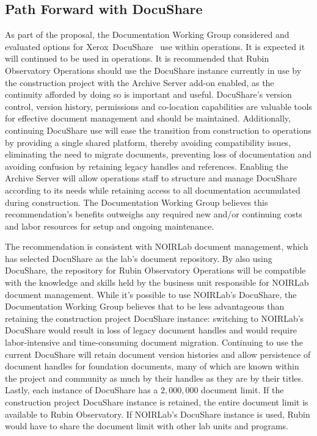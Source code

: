 \subsection{Path Forward with DocuShare}
\label{sec:docushare-path}

As part of the proposal, the Documentation Working Group considered and evaluated options for Xerox\textregistered\ DocuShare\textregistered\ \citep{DocuShare-cite} use within operations.
It is expected it will continued to be used in operations.
It is recommended that Rubin Observatory Operations should use the DocuShare instance currently in use by the construction project with the Archive Server add-on enabled, as the continuity afforded by doing so is important and useful.
DocuShare’s version control, version history, permissions and co-location capabilities are valuable tools for effective document management and should be maintained.
Additionally, continuing DocuShare use will ease the transition from construction to operations by providing a single shared platform, thereby avoiding compatibility issues, eliminating the need to migrate documents, preventing loss of documentation and avoiding confusion by retaining legacy handles and references.
Enabling the Archive Server will allow operations staff to structure and manage DocuShare according to its needs while retaining access to all documentation accumulated during construction.
The Documentation Working Group believes this recommendation’s benefits outweighs any required new and/or continuing costs and labor resources for setup and ongoing maintenance.

The recommendation is consistent with NOIRLab document management, which has selected DocuShare as the lab’s document repository.
By also using DocuShare, the repository for Rubin Observatory Operations will be compatible with the knowledge and skills held by the business unit responsible for NOIRLab document management.
While it's possible to use NOIRLab’s DocuShare, the Documentation Working Group believes that to be less advantageous than retaining the construction project DocuShare instance:
switching to NOIRLab’s DocuShare would result in loss of legacy document handles and would require labor-intensive and time-consuming document migration.
Continuing to use the current DocuShare will retain document version histories and allow persistence of document handles for foundation documents, many of which are known within the project and community as much by their handles as they are by their titles.
Lastly, each instance of DocuShare has a $2,000,000$ document limit.
If the construction project DocuShare instance is retained, the entire document limit is available to Rubin Observatory.
If NOIRLab’s DocuShare instance is used, Rubin would have to share the document limit with other lab units and programs.


